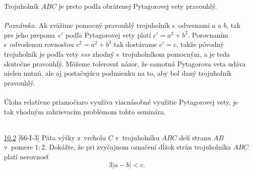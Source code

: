 Trojuholník $ABC$ je preto podľa obrátenej Pytagorovej vety pravouhlý.\\
\\
\textit{Poznámka.} Ak zvážime pomocný pravouhlý trojuholník s~odvesnami $a$ a $b$, tak pre jeho preponu~$c'$ podľa Pytagorovej vety platí $c' = a^2 + b^2$. Porovnaním s~odvodenou rovnosťou $c^2 = a^2 + b^2$ tak dostávame $c'= c$, takže pôvodný trojuholník je podľa vety $sss$ zhodný s~trojuholníkom pomocným, a je teda skutočne pravouhlý. Môžeme tolerovať názor, že samotná Pytagorova veta udáva nielen nutnú, ale aj postačujúcu podmienku na to, aby bol daný trojuholník pravouhlý.\\
\\
\kom Úloha relatívne priamočiaro využíva viacnásobné využitie Pytagorovej vety, je tak vhodným zahrievacím problémom tohto seminára.\\
\\
\begin{tcolorbox}[breakable,notitle,boxrule=0pt,colback=light-gray,colframe=light-gray]\ul{10.2} [66-I-3]
Päta výšky z~vrcholu $C$ v~trojuholníku $ABC$ delí stranu $AB$ v~pomere $1 : 2$. Dokážte, že pri zvyčajnom označení dĺžok strán trojuholníka $ABC$ platí nerovnosť $$3|a - b| < c.$$
\end{tcolorbox}

